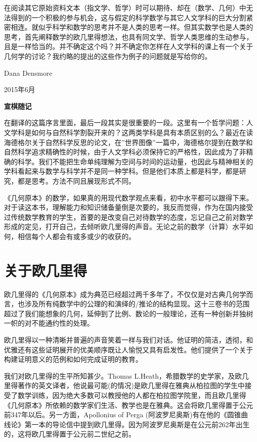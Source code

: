 \documentclass[
]{book}
\begin{document}
在阅读其它原始资料文本（指文学、哲学）时可以期待、却在（数学、几何）中无法得到的一个积极的参与机会，这与假定的科学数学与其它人文学科的巨大分割紧密相连。就似乎科学和数学的思考并不是人类的思考一样。但其实数学也是人类的思考，首先阐释数学的欧几里得想法，也具有同文学、哲学人类思维的生动参与，且是一样恰当的。并不确定这个吗？并不确定你怎样在人文学科的课上有一个关于几何学的讨论？我约略的提出的这些作为例子的问题就是写给你的。

Dana Densmore

2015年6月

\textbf{宣棋随记}

在翻译的这篇序言里面，最后一段其实是很重要的一段。这里有一个哲学问题：人文学科是如何与自然科学割裂开来的？这两类学科是具有本质区别的么？最近在读海德格尔关于自然科学反思的论文，在''世界图像''一篇中，海德格尔提到在数学和自然科学追求精确性的时候，由于人文学科必须保持它的严格性，因此成为了非精确的科学。我们不能把生命单纯理解为空间与时间的运动量，也因此与精神相关的学科看起来与数学与科学并不是同一种学科。但是他们本质上都是科学，都是研究，都是思考。方法不同且展现形式不同。

《几何原本》的数学，如果真的用现代数学观点来看，初中水平都可以跟得下来。对于读这本书，理解能力和知识储备量倒是次要的，我反而觉得，作为在国内接受过传统数学教育的学生，首要的是改变自己对待数学的态度，忘记自己之前对数学形成的定见，打开自己，去倾听欧几里得的声音。无论之前的数学（计算）水平如何，相信每个人都会有或多或少的收获的。

\hypertarget{ux5173ux4e8eux6b27ux51e0ux91ccux5f97}{%
\chapter*{关于欧几里得}\label{ux5173ux4e8eux6b27ux51e0ux91ccux5f97}}

欧几里得的《几何原本》成为典范已经超过两千多年了，不仅仅是对古典几何学而言，也涉及所有纯数学中的公理的和演绎的/推论的结构显现。这十三卷书的范围超过了我们能想象的几何，延伸到了比例、数论的一般理论，还有一种创新并独树一帜的对不能通约性的处理。

欧几里得以一种清晰并普遍的声音笑着一样与我们对话。他证明的简洁，透彻，和优雅还有这些证明展开的优美顺序既让人愉悦又具有启发性。他们提供了一个关于构建证明意义的范例和如何完成证明的教育。

我们对欧几里得的生平所知甚少。Thomas L.Heath，希腊数学的史学家，及欧几里得著作的英文译者，他说最可能(的情况)是欧几里得在雅典从柏拉图的学生中接受了数学训练，因为绝大多数可以教授他的人都在柏拉图学院里，而且欧几里得《几何原本》所依赖的数学家们生活、教学也是在雅典。这会将欧几里得置于公元前347年以后。另一方面，Apollonius of Perga (阿波罗尼奥斯)有在他的《圆锥曲线论》第一本的导论信中提到欧几里得。因为阿波罗尼奥斯是在公元前262年出生的，这将欧几里得置于公元前二世纪之前。
\end{document}

